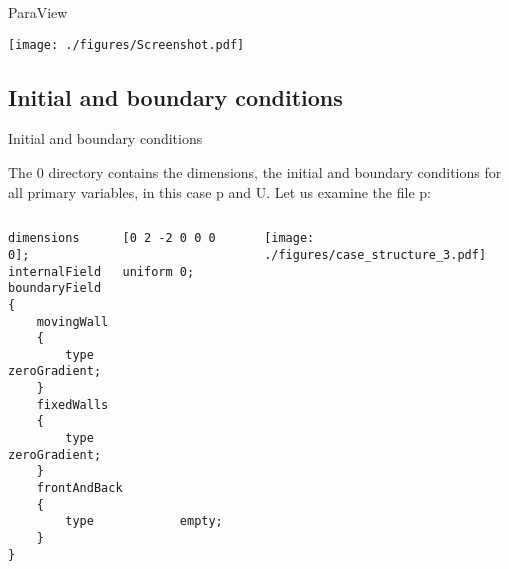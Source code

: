 \documentclass{beamer}
\begin{document}
\begin{frame}{ParaView}

\begin{center}\texttt{[image: ./figures/Screenshot.pdf]}\end{center}

\end{frame}

\subsection{Initial and boundary conditions}


\begin{frame}[fragile]{Initial and boundary conditions}

The 0 directory contains the dimensions, the initial and boundary conditions
for all primary variables, in this case p and U. Let us examine the file p:
\vspace{-0.5cm}
\begin{columns}[c]
\column{7.0cm} 
\begin{footnotesize}
\begin{verbatim}
dimensions      [0 2 -2 0 0 0 0];
internalField   uniform 0;
boundaryField
{
    movingWall
    {
        type            zeroGradient;
    }
    fixedWalls
    {
        type            zeroGradient;
    }
    frontAndBack
    {
        type            empty;
    }
}
\end{verbatim}
\end{footnotesize}
\column{4.0cm} 
\vspace{-0.2cm}
\begin{center}\texttt{[image: ./figures/case\_structure\_3.pdf]}\end{center}
\end{columns}



\end{frame}
\end{document}
